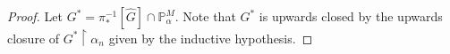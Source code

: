 \documentclass[a4paper, 11pt]{amsart}
\theoremstyle{remark}
\newcommand{\PP}{\mathbb{P}}
\begin{document}
\begin{proof}









Let $G^*=\pi_*^{-1}[\hat{G}]\cap \PP_\alpha^M$. 
Note that $G^*$ is upwards closed by the upwards closure of $G^*{\upharpoonright}\alpha_n$ given by the inductive hypothesis. 


\end{proof}
\end{document}
